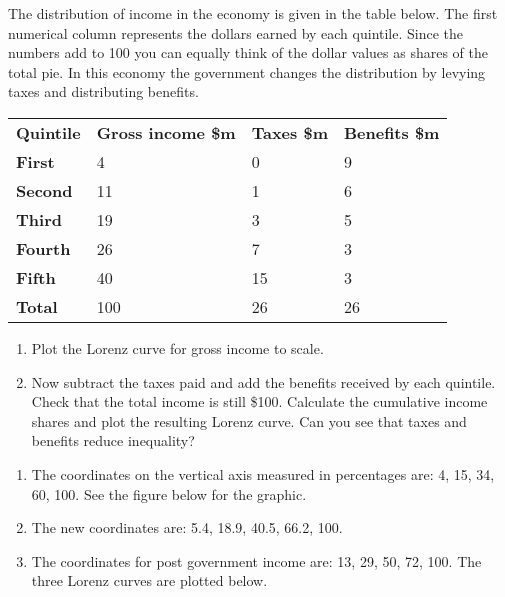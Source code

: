 \begin{enumialphparenastyle}
\begin{econex}\label{ex:ch13ex3}
The distribution of income in the economy is given in the table below. The first numerical column represents the dollars earned by each quintile. Since the numbers add to 100 you can equally think of the dollar values as shares of the total pie. In this economy the government changes the distribution by levying taxes and distributing benefits.
\begin{Table}{}
\begin{tabu} to \linewidth {|X[0.5,c]X[1,c]X[1,c]X[1,c]|}	\hline
{}	\textbf{Quintile}	&	\textbf{Gross income \$m}	&	\textbf{Taxes \$m}	&	\textbf{Benefits \$m}	\\
\textbf{First}		&	4							&	0					&	9						\\
	\textbf{Second}		&	11							&	1					&	6						\\
\textbf{Third}		&	19							&	3					&	5						\\
	\textbf{Fourth}		&	26							&	7					&	3						\\
\textbf{Fifth}		&	40							&	15					&	3						\\
	\textbf{Total}		&	100							&	26					&	26						\\	\hline
\end{tabu}
\end{Table}
\begin{enumerate}
\item	Plot the Lorenz curve for gross income to scale.
\item	Now subtract the taxes paid and add the benefits received by each quintile. Check that the total income is still \$100. Calculate the cumulative income shares and plot the resulting Lorenz curve. Can you see that taxes and benefits reduce inequality?
\end{enumerate}
\begin{econsolution}
\begin{enumerate}
\item	The coordinates on the vertical axis measured in percentages are: 4, 15, 34, 60, 100. See the figure below for the graphic.
\item	The new coordinates are: 5.4, 18.9, 40.5, 66.2, 100.
\item	The coordinates for post government income are: 13, 29, 50, 72, 100. The three Lorenz curves are plotted below.
\end{enumerate}
\begin{center*}
\begin{tikzpicture}[background color=figurebkgdcolour,use background]

\end{tikzpicture}
\end{center*}
\end{econsolution}
\end{econex}
\end{enumialphparenastyle}
